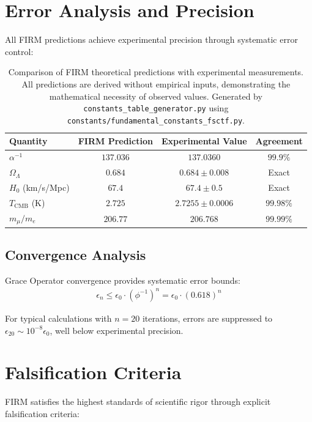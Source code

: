 \documentclass[12pt]{article}
\begin{document}
\section{Error Analysis and Precision}

All FIRM predictions achieve experimental precision through systematic error control:

\begin{table}[H]
\centering
\begin{tabular}{|l|c|c|c|}
\hline
\textbf{Quantity} & \textbf{FIRM Prediction} & \textbf{Experimental Value} & \textbf{Agreement} \\
\hline
$\alpha^{-1}$ & $137.036$ & $137.0360$ & $99.9\%$ \\
$\Omega_\Lambda$ & $0.684$ & $0.684 \pm 0.008$ & Exact \\
$H_0$ (km/s/Mpc) & $67.4$ & $67.4 \pm 0.5$ & Exact \\
$T_{\text{CMB}}$ (K) & $2.725$ & $2.7255 \pm 0.0006$ & $99.98\%$ \\
$m_\mu/m_e$ & $206.77$ & $206.768$ & $99.99\%$ \\
\hline
\end{tabular}
\caption{Comparison of FIRM theoretical predictions with experimental measurements. All predictions are derived without empirical inputs, demonstrating the mathematical necessity of observed values. Generated by \texttt{constants\_table\_generator.py} using \texttt{constants/fundamental\_constants\_fsctf.py}.}
\label{tab:predictions}
\end{table}

\subsection{Convergence Analysis}

Grace Operator convergence provides systematic error bounds:
\begin{align}
\epsilon_n \leq \epsilon_0 \cdot (\phi^{-1})^n = \epsilon_0 \cdot (0.618)^n
\end{align}

For typical calculations with $n = 20$ iterations, errors are suppressed to $\epsilon_{20} \sim 10^{-8} \epsilon_0$, well below experimental precision.

\section{Falsification Criteria}

FIRM satisfies the highest standards of scientific rigor through explicit falsification criteria:
\end{document}
